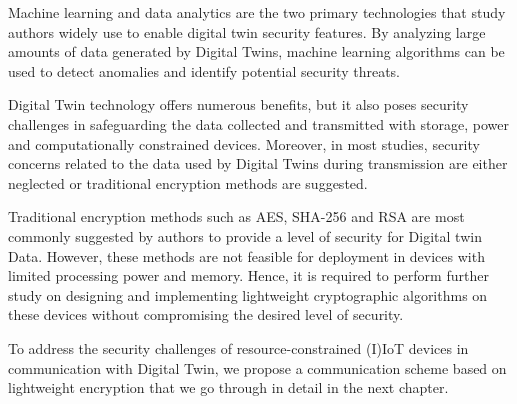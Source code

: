 
Machine learning and data analytics are the two primary technologies that study authors widely use to enable digital twin security features. By analyzing large amounts of data generated by Digital Twins, machine learning algorithms can be used to detect anomalies and identify potential security threats.

Digital Twin technology offers numerous benefits, but it also poses security challenges in safeguarding the data collected and transmitted with storage, power and computationally constrained devices. Moreover, in most studies, security concerns related to the data used by Digital Twins during transmission are either neglected or traditional encryption methods are suggested.

Traditional encryption methods such as AES, SHA-256 and RSA are most commonly suggested by authors to provide a level of security for Digital twin Data. However, these methods are not feasible for deployment in devices with limited processing power and memory. Hence, it is required to perform further study on designing and implementing lightweight cryptographic algorithms on these devices without compromising the desired level of security. 

To address the security challenges of resource-constrained (I)IoT devices in communication with Digital Twin, we propose a communication scheme based on lightweight encryption that we go through in detail in the next chapter. 


